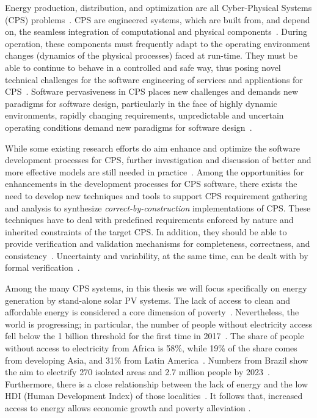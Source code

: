 Energy production, distribution, and optimization are all Cyber-Physical Systems (CPS) problems~\cite{UC}. CPS are engineered systems, which are built from, and depend on, the seamless integration of computational and physical components~\cite{NSF2015,ChavesIBCF19,iet-cps.2018.5006}. During operation, these components must frequently adapt to the operating environment changes (dynamics of the physical processes) faced at run-time. They must be able to continue to behave in a controlled and safe way, thus posing novel technical challenges for the software engineering of services and applications for CPS~\cite{Metzger2014}. Software pervasiveness in CPS places new challenges and demands new paradigms for software design, particularly in the face of highly dynamic environments, rapidly changing requirements, unpredictable and uncertain operating conditions demand new paradigms for software design~\cite{Filieri2015}.

While some existing research efforts do aim enhance and optimize the software development processes for CPS, further investigation and discussion of better and more effective models are still needed in practice~\cite{Al-Jaroodi2016}. Among the opportunities for enhancements in the development processes for CPS software, there exists the need to develop new techniques and tools to support CPS requirement gathering and analysis to synthesize \textit{correct-by-construction} implementations of CPS. These techniques have to deal with predefined requirements enforced by nature and inherited constraints of the target CPS. In addition, they should be able to provide verification and validation mechanisms for completeness, correctness, and consistency~\cite{Al-Jaroodi2016}. Uncertainty and variability, at the same time, can be dealt with by formal verification~\cite{NESSI}. 

Among the many CPS systems, in this thesis we will focus specifically on energy generation by stand-alone solar PV systems. The lack of access to clean and affordable energy is considered a core dimension of poverty~\cite{Hussein2012}. Nevertheless, the world is progressing; in particular, the number of people without electricity access fell below the 1 billion threshold for the first time in 2017~\cite{IEAweo2018}. The share of people without access to electricity from Africa is 58\%, while 19\% of the share comes from developing Asia, and 31\% from Latin America~\cite{IEAweo2018}. Numbers from Brazil show the aim to electrify 270 isolated areas and 2.7 million people by 2023~\cite{EPE2018}. 
Furthermore, there is a close relationship between the lack of energy and the low HDI (Human Development Index) of those localities~\cite{Coelho}. It follows that, increased access to energy allows economic growth and poverty alleviation \cite{Karekesi}.


